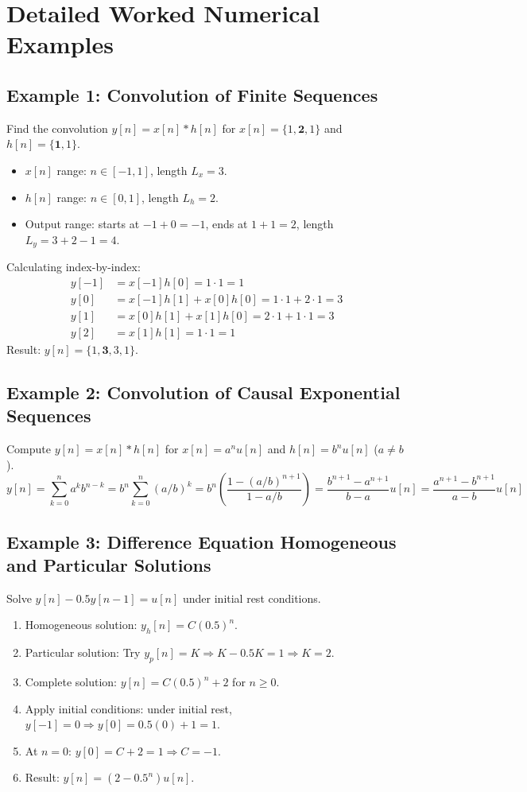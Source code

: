 \documentclass[11pt,a4paper]{article}
\begin{document}
\section{Detailed Worked Numerical Examples}

\subsection{Example 1: Convolution of Finite Sequences}
Find the convolution $y[n] = x[n] * h[n]$ for $x[n] = \{1, \mathbf{2}, 1\}$ and $h[n] = \{\mathbf{1}, 1\}$.
\begin{itemize}
    \item $x[n]$ range: $n \in [-1, 1]$, length $L_x = 3$.
    \item $h[n]$ range: $n \in [0, 1]$, length $L_h = 2$.
    \item Output range: starts at $-1 + 0 = -1$, ends at $1 + 1 = 2$, length $L_y = 3 + 2 - 1 = 4$.
\end{itemize}
Calculating index-by-index:
\begin{align*}
y[-1] &= x[-1]h[0] = 1 \cdot 1 = 1 \\
y[0]  &= x[-1]h[1] + x[0]h[0] = 1 \cdot 1 + 2 \cdot 1 = 3 \\
y[1]  &= x[0]h[1] + x[1]h[0] = 2 \cdot 1 + 1 \cdot 1 = 3 \\
y[2]  &= x[1]h[1] = 1 \cdot 1 = 1
\end{align*}
Result: $y[n] = \{1, \mathbf{3}, 3, 1\}$.

\subsection{Example 2: Convolution of Causal Exponential Sequences}
Compute $y[n] = x[n] * h[n]$ for $x[n] = a^n u[n]$ and $h[n] = b^n u[n]$ ($a \neq b$).
\begin{equation*}
y[n] = \sum_{k=0}^{n} a^k b^{n-k} = b^n \sum_{k=0}^{n} (a/b)^k = b^n \left( \frac{1 - (a/b)^{n+1}}{1 - a/b} \right) = \frac{b^{n+1} - a^{n+1}}{b - a} u[n] = \frac{a^{n+1} - b^{n+1}}{a - b} u[n]
\end{equation*}

\subsection{Example 3: Difference Equation Homogeneous and Particular Solutions}
Solve $y[n] - 0.5 y[n-1] = u[n]$ under initial rest conditions.
\begin{enumerate}
    \item Homogeneous solution: $y_h[n] = C(0.5)^n$.
    \item Particular solution: Try $y_p[n] = K \Rightarrow K - 0.5K = 1 \Rightarrow K = 2$.
    \item Complete solution: $y[n] = C(0.5)^n + 2$ for $n \ge 0$.
    \item Apply initial conditions: under initial rest, $y[-1]=0 \Rightarrow y[0] = 0.5(0) + 1 = 1$.
    \item At $n=0$: $y[0] = C + 2 = 1 \Rightarrow C = -1$.
    \item Result: $y[n] = (2 - 0.5^n)u[n]$.
\end{enumerate}
\end{document}
